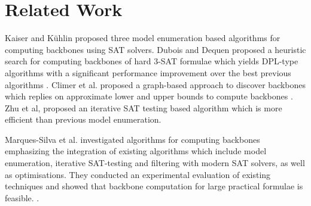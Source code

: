 \section{Related Work}\label{sec:relw}

Kaiser and K\"{u}hlin proposed three model enumeration based algorithms for computing backbones \cite{KKW2001} using SAT solvers.
%
Dubois and Dequen proposed a heuristic search for computing backbones of hard 3-SAT formulae which yields DPL-type algorithms with a significant
performance improvement over the best previous algorithms \cite{DD2001}.
Climer et al. proposed a graph-based approach to discover backbones which replies on approximate lower and upper bounds to compute
backbones \cite{CZ2002}. 
Zhu et al, proposed an iterative SAT testing based algorithm \cite{ZWSM11,ZWM11} which is more efficient than previous model enumeration.

Marques-Silva et al.  investigated algorithms for computing backbones emphasizing the integration of existing algorithms which include model enumeration, iterative SAT-testing and filtering with modern SAT solvers, as well as optimisations.
They conducted an experimental evaluation of existing techniques and showed that backbone computation for large practical formulae is feasible. \cite{MJML2010,JLMS12,JLM15}.






